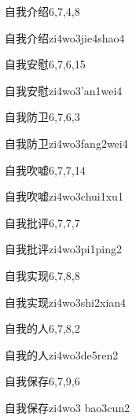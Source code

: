 \begin{entry}{自我介绍}{6,7,4,8}
  \begin{phonetics}{自我介绍}{zi4wo3jie4shao4}
  \end{phonetics}
\end{entry}

\begin{entry}{自我安慰}{6,7,6,15}
  \begin{phonetics}{自我安慰}{zi4wo3'an1wei4}
  \end{phonetics}
\end{entry}

\begin{entry}{自我防卫}{6,7,6,3}
  \begin{phonetics}{自我防卫}{zi4wo3fang2wei4}
  \end{phonetics}
\end{entry}

\begin{entry}{自我吹嘘}{6,7,7,14}
  \begin{phonetics}{自我吹嘘}{zi4wo3chui1xu1}
  \end{phonetics}
\end{entry}

\begin{entry}{自我批评}{6,7,7,7}
  \begin{phonetics}{自我批评}{zi4wo3pi1ping2}
  \end{phonetics}
\end{entry}

\begin{entry}{自我实现}{6,7,8,8}
  \begin{phonetics}{自我实现}{zi4wo3shi2xian4}
  \end{phonetics}
\end{entry}

\begin{entry}{自我的人}{6,7,8,2}
  \begin{phonetics}{自我的人}{zi4wo3de5ren2}
  \end{phonetics}
\end{entry}

\begin{entry}{自我保存}{6,7,9,6}
  \begin{phonetics}{自我保存}{zi4wo3 bao3cun2}
  \end{phonetics}
\end{entry}

